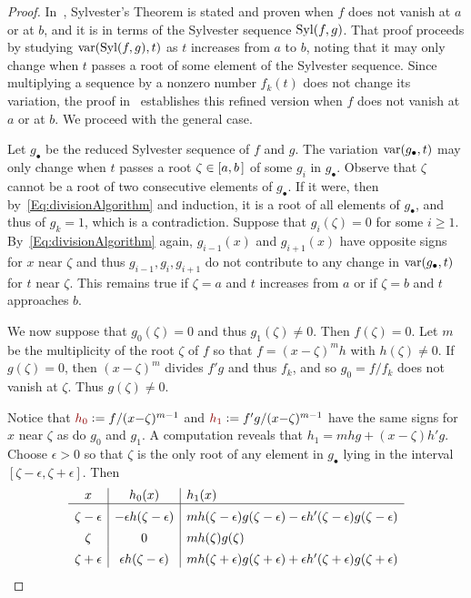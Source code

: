 \documentclass[12pt]{amsart}
\theoremstyle{definition}
\DeclareMathOperator{\var}{{\rm var}}
\DeclareMathOperator{\Syl}{{\rm Syl}}
\newcommand{\defcolor}[1]{{\color{TAMU}#1}}
\begin{document}
\begin{proof}
  In~\cite[Thm.\ 2.55]{BPR}, Sylvester's Theorem is stated and proven 
  when $f$ does not vanish at $a$ or at $b$, and it is in terms of the Sylvester sequence $\Syl(f,g)$.
  That proof proceeds by studying $\var(\Syl(f,g), t)$ as $t$ increases from $a$ to $b$, noting that it may only
  change when $t$ passes a root of some element of the Sylvester sequence.
  Since multiplying a sequence by a nonzero number $f_k(t)$ does not change its variation, the proof in~\cite{BPR}
  establishes this refined  version when $f$ does not vanish at $a$ or at $b$.
  We proceed with the general case.

  Let $g_\bullet$ be the reduced Sylvester sequence of $f$ and $g$.
  The variation $\var(g_\bullet,t)$ may only change when $t$ passes a root $\zeta\in[a,b\hspace{.05cm}]$ of some $g_i$ in
  $g_\bullet$. 
  Observe that $\zeta$ cannot be a root of two consecutive elements of $g_\bullet$.
  If it were, then by~\eqref{Eq:divisionAlgorithm} and induction, it is a root of all elements of $g_\bullet$, and thus of
  $g_k=1$, which is a contradiction.
  Suppose that $g_i(\zeta)=0$ for some $i\geq 1$.
  By~\eqref{Eq:divisionAlgorithm} again, $g_{i-1}(x)$ and $g_{i+1}(x)$ have opposite signs for $x$ near $\zeta$ and thus
  $g_{i-1},g_i,g_{i+1}$ do not contribute to any change in $\var(g_\bullet,t)$ for $t$ near $\zeta$.
  This remains true if $\zeta=a$ and $t$ increases from $a$ or if $\zeta=b$ and $t$ approaches $b$.

  We now suppose that $g_0(\zeta)=0$ and thus $g_1(\zeta)\neq 0$.
  Then $f(\zeta)=0$.
  Let $m$ be the multiplicity of the root $\zeta$ of $f$ so that $f=(x{-}\zeta)^m h$ with $h(\zeta)\neq 0$.
  If $g(\zeta)=0$, then $(x{-}\zeta)^m$ divides $f'g$ and thus $f_k$, and so $g_0=f/f_k$ does not vanish at $\zeta$.
  Thus $g(\zeta)\neq 0$.

  Notice that $\defcolor{h_0}\vcentcolon=f/(x{-}\zeta)^{m-1}$ and $\defcolor{h_1}\vcentcolon=f'g/(x{-}\zeta)^{m-1}$ have the same signs for
  $x$ near $\zeta$ as do $g_0$ and $g_1$.
  A computation reveals that $h_1=mhg+(x{-}\zeta)h'g$.
 Choose $\epsilon>0$ so that $\zeta$ is the only root of any element in $g_\bullet$ lying in the interval
 $[\zeta-\epsilon,\zeta+\epsilon]$.
 Then
 \[
 \begin{array}{c|c|l}
   x & h_0(x) & h_1(x)\\\hline
   \zeta-\epsilon & -\epsilon h(\zeta-\epsilon)  &
        mh(\zeta-\epsilon)g(\zeta-\epsilon) - \epsilon h'(\zeta-\epsilon)g(\zeta-\epsilon)  \rule{0pt}{13pt}\\
   \zeta     &     0    &   mh(\zeta)g(\zeta)  \rule{0pt}{13pt}\\
   \zeta+\epsilon & \epsilon h(\zeta-\epsilon)  &
        mh(\zeta+\epsilon)g(\zeta+\epsilon) + \epsilon h'(\zeta+\epsilon)g(\zeta+\epsilon)  \rule{0pt}{13pt}
 \end{array}
 \]
 

\end{proof}
\end{document}
